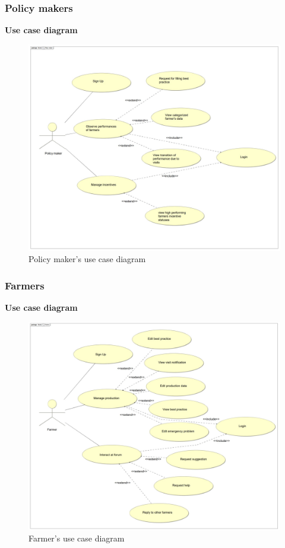 \subsubsection{Policy makers}
\textbf{\textcolor{myblue}{Use case diagram}}
\begin{figure}[H]
	\centering
    \includegraphics[page=1, width=\textwidth]{Images/ud_policy.JPG}
	\caption{\label{fig:use_case_diagram}Policy maker's use case diagram}
\end{figure}
\label{sect:policy_maker_requirements}



\subsubsection{Farmers}
\textbf{\textcolor{myblue}{Use case diagram}}
\begin{figure}[H]
	\centering
    \includegraphics[page=1, width=\textwidth]{Images/ud_fa.JPG}
	\caption{\label{fig:use_case_diagram}Farmer's use case diagram}
\end{figure}
\label{sect:farmer_requirements}


